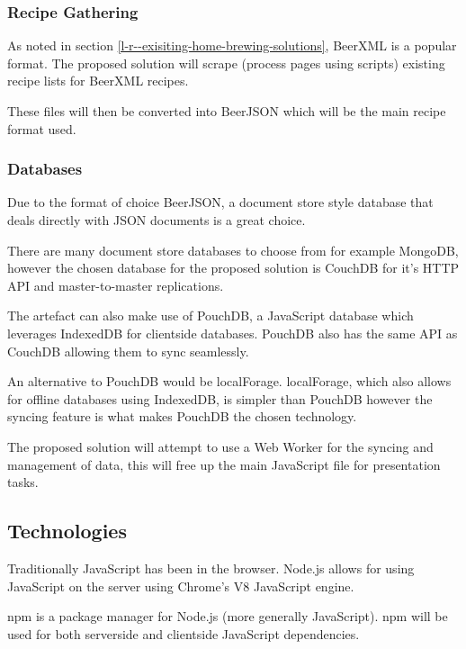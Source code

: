 \subsubsection{Recipe Gathering} \label{a-d--d--recipe-gathering}

As noted in section \ref{l-r--exisiting-home-brewing-solutions}, BeerXML is a popular format.
The proposed solution will scrape (process pages using scripts) existing recipe lists for BeerXML recipes.

These files will then be converted into BeerJSON which will be the main recipe format used.

\subsubsection{Databases} \label{a-d--d--databases}

Due to the format of choice BeerJSON, a document store style database that deals directly with JSON documents is a great choice.

There are many document store databases to choose from for example MongoDB, however the chosen database for the proposed solution is CouchDB for it's HTTP API and master-to-master replications. \cite{couchdb}

The artefact can also make use of PouchDB, a JavaScript database which leverages IndexedDB for clientside databases. PouchDB also has the same API as CouchDB allowing them to sync seamlessly.

An alternative to PouchDB would be localForage. localForage, which also allows for offline databases using IndexedDB, is simpler than PouchDB however the syncing feature is what makes PouchDB the chosen technology.

The proposed solution will attempt to use a Web Worker for the syncing and management of data, this will free up the main JavaScript file for presentation tasks.

\subsection{Technologies} \label{a-d--technologies}

Traditionally JavaScript has been in the browser. Node.js allows for using JavaScript on the server using Chrome's V8 JavaScript engine. \cite{node.js}

npm is a package manager for Node.js (more generally JavaScript). npm will be used for both serverside and clientside JavaScript dependencies.

